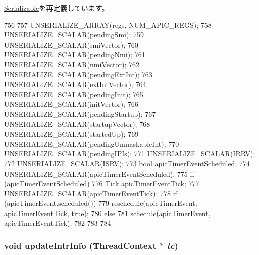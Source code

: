 \hyperlink{classSerializable_af100c4e9feabf3cd918619c88c718387}{Serializable}を再定義しています。


\begin{DoxyCode}
756 {
757     UNSERIALIZE_ARRAY(regs, NUM_APIC_REGS);
758     UNSERIALIZE_SCALAR(pendingSmi);
759     UNSERIALIZE_SCALAR(smiVector);
760     UNSERIALIZE_SCALAR(pendingNmi);
761     UNSERIALIZE_SCALAR(nmiVector);
762     UNSERIALIZE_SCALAR(pendingExtInt);
763     UNSERIALIZE_SCALAR(extIntVector);
764     UNSERIALIZE_SCALAR(pendingInit);
765     UNSERIALIZE_SCALAR(initVector);
766     UNSERIALIZE_SCALAR(pendingStartup);
767     UNSERIALIZE_SCALAR(startupVector);
768     UNSERIALIZE_SCALAR(startedUp);
769     UNSERIALIZE_SCALAR(pendingUnmaskableInt);
770     UNSERIALIZE_SCALAR(pendingIPIs);
771     UNSERIALIZE_SCALAR(IRRV);
772     UNSERIALIZE_SCALAR(ISRV);
773     bool apicTimerEventScheduled;
774     UNSERIALIZE_SCALAR(apicTimerEventScheduled);
775     if (apicTimerEventScheduled) {
776         Tick apicTimerEventTick;
777         UNSERIALIZE_SCALAR(apicTimerEventTick);
778         if (apicTimerEvent.scheduled()) {
779             reschedule(apicTimerEvent, apicTimerEventTick, true);
780         } else {
781             schedule(apicTimerEvent, apicTimerEventTick);
782         }
783     }
784 }
\end{DoxyCode}
\hypertarget{classX86ISA_1_1Interrupts_a00892e9b06edcba6c3c27454d6235100}{
\subsubsection[{updateIntrInfo}]{\setlength{\rightskip}{0pt plus 5cm}void updateIntrInfo ({\bf ThreadContext} $\ast$ {\em tc})}}
\label{classX86ISA_1_1Interrupts_a00892e9b06edcba6c3c27454d6235100}



